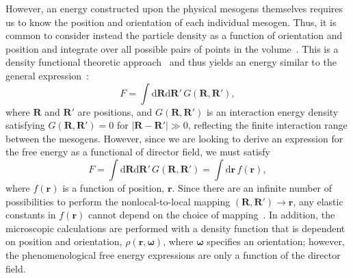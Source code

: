 However, an energy constructed upon the physical mesogens themselves requires us to know the position and orientation of each individual mesogen.
Thus, it is common to consider instead the particle density as a function of orientation and position and integrate over all possible pairs of points in the volume~\cite{RN222}.
This is a density functional theoretic approach~\cite{RN223} and thus yields an energy similar to the general expression~\cite{RN56,RN55}:
\begin{equation}
  F = \int \textrm{d}\mathbf{R} \textrm{d}\mathbf{R}' \, G(\mathbf{R},\mathbf{R}'),
\end{equation}
where $\mathbf{R}$ and $\mathbf{R}'$ are positions, and $G(\mathbf{R},\mathbf{R}')$ is an interaction energy density satisfying $G(\mathbf{R},\mathbf{R}') = 0$ for $|\mathbf{R}-\mathbf{R}'| \gg 0$, reflecting the finite interaction range between the mesogens.
However, since we are looking to derive an expression for the free energy as a functional of director field, we must satisfy
\begin{equation}
  F = \int \textrm{d}\mathbf{R} \textrm{d}\mathbf{R}' \, G(\mathbf{R},\mathbf{R}')
  = \int \textrm{d} \mathbf{r} \, f(\mathbf{r}),\label{e:2-NonlocalLocal}
\end{equation}
where $f(\mathbf{r})$ is a function of position, $\mathbf{r}$.
Since there are an infinite number of possibilities to perform the nonlocal-to-local mapping $(\mathbf{R},\mathbf{R}') \rightarrow \mathbf{r}$, any elastic constants in $f(\mathbf{r})$ cannot depend on the choice of mapping~\cite{RN55}.
In addition, the microscopic calculations are performed with a density function that is dependent on position and orientation, $\rho(\mathbf{r},\mathbf{\omega})$, where $\mathbf{\omega}$ specifies an orientation; however, the phenomenological free energy expressions are only a function of the director field.

